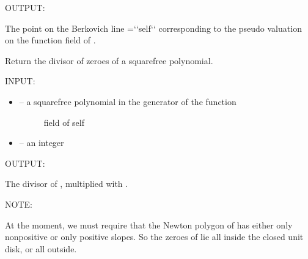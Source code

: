 \documentclass[letterpaper,10pt,english]{sphinxmanual}
\begin{document}
\begin{fulllineitems}
\begin{fulllineitems}
\begin{itemize}
\begin{description}
\end{description}

\end{itemize}

OUTPUT:

The point  on the Berkovich line  ={}`{}`self{}`{}` corresponding to
the pseudo valuation  on the function field of .

\end{fulllineitems}


\begin{fulllineitems}
\label{berkovich_line:mclf.berkovich.berkovich_line.BerkovichLine.polynomial_divisor}
Return the divisor of zeroes of a squarefree polynomial.

INPUT:
\begin{itemize}
\item {} \begin{description}
\item[{ -- a squarefree polynomial in the generator of the function}] \leavevmode
field of self

\end{description}

\item {} 
 -- an integer

\end{itemize}

OUTPUT:

The divisor of , multiplied with .

NOTE:

At the moment, we must require that the Newton polygon of  has
either only nonpositive or only positive slopes. So the zeroes of
 lie all inside the closed unit disk, or all outside.

\end{fulllineitems}


\end{fulllineitems}

\end{document}
